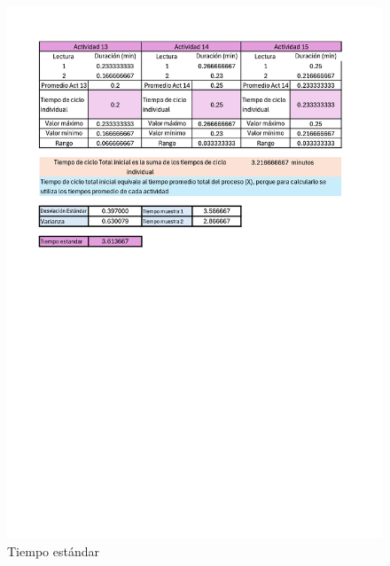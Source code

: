     \begin{figure}[H]
        \centering
        \includegraphics[trim = {15mm 160mm 20mm 
        40mm},clip,scale=0.35]{16/Img/tiempoEstandarM.pdf}
        \caption{Tiempo estándar}
        \label{fig:Tiempo estándar}
    \end{figure}
   
